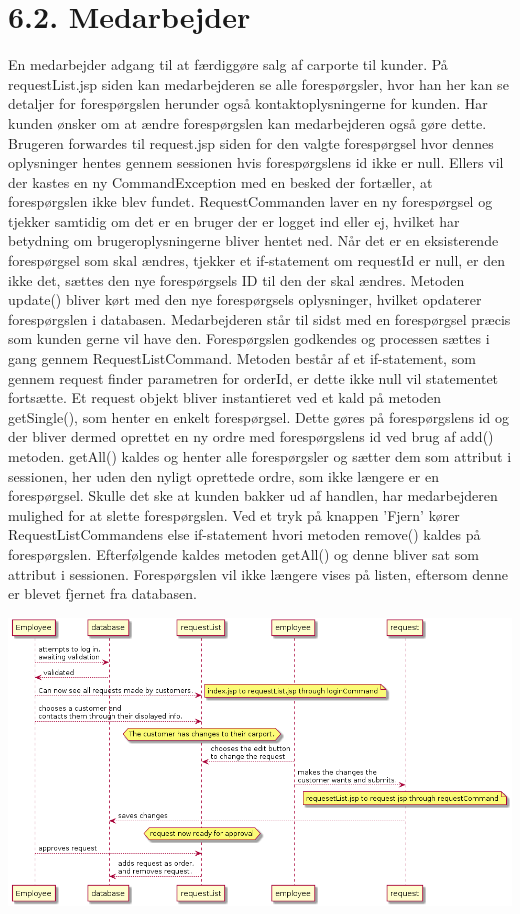 \documentclass[11pt]{report}
\begin{document}
\section*{6.2. Medarbejder}
En medarbejder adgang til at færdiggøre salg af carporte til kunder. På requestList.jsp siden kan medarbejderen se alle forespørgsler, hvor han her kan se detaljer for forespørgslen herunder også kontaktoplysningerne for kunden. Har kunden ønsker om at ændre forespørgslen kan medarbejderen også gøre dette. Brugeren forwardes til request.jsp siden for den valgte forespørgsel hvor dennes oplysninger hentes gennem sessionen hvis forespørgslens id ikke er null. Ellers vil der kastes en ny CommandException med en besked der fortæller, at forespørgslen ikke blev fundet.
RequestCommanden laver en ny forespørgsel og tjekker samtidig om det er en bruger der er logget ind eller ej, hvilket har betydning om brugeroplysningerne bliver hentet ned. Når det er en eksisterende forespørgsel som skal ændres, tjekker et if-statement om requestId er null, er den ikke det, sættes den nye forespørgsels ID til den der skal ændres. Metoden update() bliver kørt med den nye forespørgsels oplysninger, hvilket opdaterer forespørgslen i databasen.
Medarbejderen står til sidst med en forespørgsel præcis som kunden gerne vil have den. Forespørgslen godkendes og processen sættes i gang gennem RequestListCommand. Metoden består af et if-statement, som gennem request finder parametren for orderId, er dette ikke null vil statementet fortsætte. Et request objekt bliver instantieret ved et kald på metoden getSingle(), som henter en enkelt forespørgsel. Dette gøres på forespørgslens id og der bliver dermed oprettet en ny ordre med forespørgslens id ved brug af add() metoden. getAll() kaldes og henter alle forespørgsler og sætter dem som attribut i sessionen, her uden den nyligt oprettede ordre, som ikke længere er en forespørgsel.
Skulle det ske at kunden bakker ud af handlen, har medarbejderen mulighed for at slette forespørgslen. Ved et tryk på knappen ’Fjern’ kører RequestListCommandens else if-statement hvori metoden remove() kaldes på forespørgslen. Efterfølgende kaldes metoden getAll() og denne bliver sat som attribut i sessionen. Forespørgslen vil ikke længere vises på listen, eftersom denne er blevet fjernet fra databasen. 
\begin{center}
\includegraphics[width=15cm]{EmployeeArbejde.png}
\end{center}
\newpage
\end{document}
